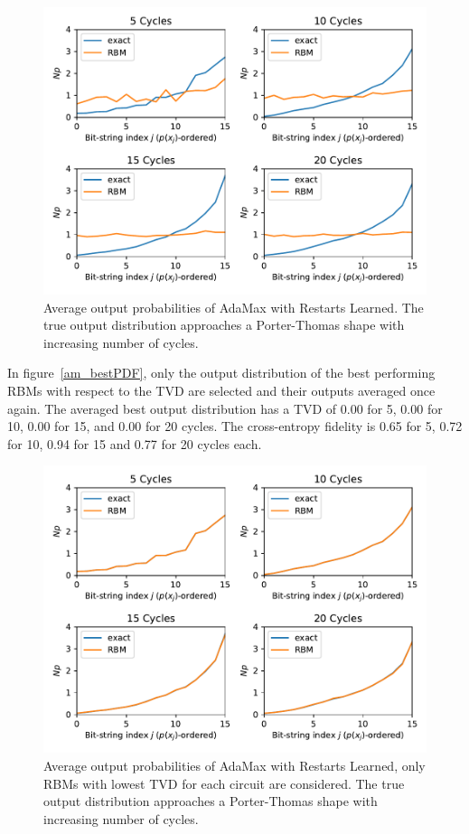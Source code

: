 \begin{figure}[H]
  \centering
  \includegraphics[width=\textwidth]{figures/results/AM-restarts-learned/avgPDF.pdf}
  \caption[Average output probabilities of AdaMax with Restarts Learned]{
    Average output probabilities of AdaMax with Restarts Learned. The true 
    output distribution approaches a Porter-Thomas shape with increasing number of cycles.}
  \label{fig:am_avgPDF}
\end{figure}

In figure~\ref{am_bestPDF}, only the output distribution of the best performing RBMs with respect to the 
TVD are selected and their outputs averaged once again. The averaged best output distribution 
has a TVD of 0.00 for 5, 0.00 for 10, 0.00 for 15, and 0.00 for 20 
cycles. The cross-entropy fidelity is 0.65 for 5, 0.72 for 10, 0.94 for 15 and 0.77 for 20 cycles each. 

\begin{figure}[H]
  \centering
  \includegraphics[width=\textwidth]{figures/results/AM-restarts-learned/avgBestPDF.pdf}
  \caption[Averaged best performing output probabilities of AdaMax with Restarts Learned]{
    Average output probabilities of AdaMax with Restarts Learned, only RBMs with lowest
    TVD for each circuit are considered. The true 
    output distribution approaches a Porter-Thomas shape with increasing number of cycles.}
  \label{fig:am_avgBestPDF}
\end{figure}

